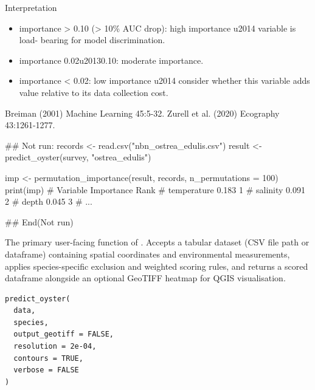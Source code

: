 \documentclass[a4paper]{book}
\begin{document}
%
\begin{Section}{Interpretation}

\begin{itemize}

\item{} importance > 0.10 (> 10\% AUC drop): high importance \bsl{}u2014 variable is load-
bearing for model discrimination.
\item{} importance 0.02\bsl{}u20130.10: moderate importance.
\item{} importance < 0.02: low importance \bsl{}u2014 consider whether this variable adds
value relative to its data collection cost.

\end{itemize}

\end{Section}
%
\begin{References}
Breiman (2001) Machine Learning 45:5-32.
Zurell et al. (2020) Ecography 43:1261-1277.
\end{References}
%
\begin{Examples}
\begin{ExampleCode}
## Not run: 
records <- read.csv("nbn_ostrea_edulis.csv")
result  <- predict_oyster(survey, "ostrea_edulis")

imp <- permutation_importance(result, records, n_permutations = 100)
print(imp)
# Variable        Importance  Rank
# temperature     0.183       1
# salinity        0.091       2
# depth           0.045       3
# ...

## End(Not run)
\end{ExampleCode}
\end{Examples}
%
\begin{Description}
The primary user-facing function of . Accepts a tabular dataset
(CSV file path or dataframe) containing spatial coordinates and environmental
measurements, applies species-specific exclusion and weighted scoring rules,
and returns a scored dataframe alongside an optional GeoTIFF heatmap for
QGIS visualisation.
\end{Description}
%
\begin{Usage}
\begin{verbatim}
predict_oyster(
  data,
  species,
  output_geotiff = FALSE,
  resolution = 2e-04,
  contours = TRUE,
  verbose = FALSE
)
\end{verbatim}
\end{Usage}
\end{document}
